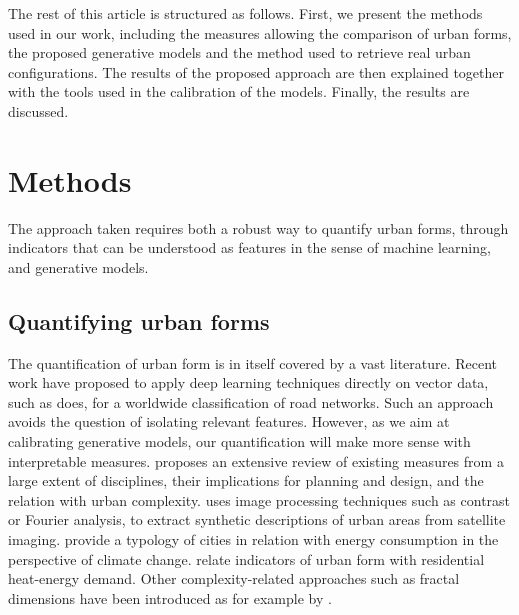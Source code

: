 \documentclass[letterpaper]{article}
\begin{document}
The rest of this article is structured as follows.
First, we present the methods used in our work, including the measures allowing the comparison of urban forms, the proposed generative models and the method used to retrieve real urban configurations.
The results of the proposed approach are then explained together with the tools used in the calibration of the models.
Finally, the results are discussed.

\section{Methods} \label{sec:methods}

The approach taken requires both a robust way to quantify urban forms, through indicators that can be understood as features in the sense of machine learning, and generative models.

\subsection{Quantifying urban forms}

The quantification of urban form is in itself covered by a vast literature.
Recent work have proposed to apply deep learning techniques directly on vector data, such as \cite{2017arXiv170902939M} does, for a worldwide classification of road networks. Such an approach avoids the question of isolating relevant features.
However, as we aim at calibrating generative models, our quantification will make more sense with interpretable measures.
\cite{boeing2018measuring} proposes an extensive review of existing measures from a large extent of disciplines, their implications for planning and design, and the relation with urban complexity. \cite{webster1995urban} uses image processing techniques such as contrast or Fourier analysis, to extract synthetic descriptions of urban areas from satellite imaging. \cite{fumega2014identification} provide a typology of cities in relation with energy consumption in the perspective of climate change. \cite{rode2014cities} relate indicators of urban form with residential heat-energy demand. Other complexity-related approaches such as fractal dimensions have been introduced as for example by \cite{batty1987fractal}.

\end{document}
